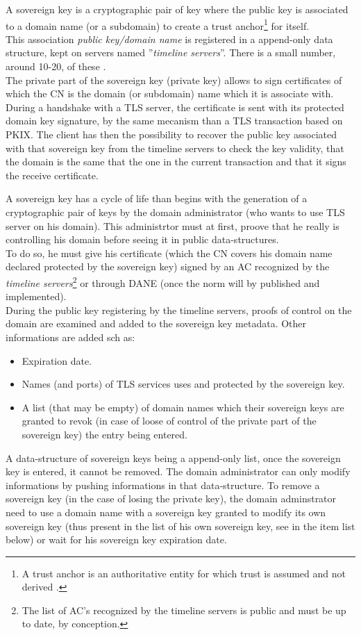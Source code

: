 \documentclass[journal, a4paper]{IEEEtran}
\begin{document}
A sovereign key is a cryptographic pair of key where the public key is associated to a domain name (or a subdomain) to create a trust anchor\footnote{A trust anchor is an authoritative entity for which trust is assumed and not derived \cite{wallace2010}.} for itself.\\
This association \textit{public key/domain name} is registered in a append-only data structure, kept on servers named ''\textit{timeline servers}''. There is a small number, around 10-20, of these \cite{eck2014}.\\
The private part of the sovereign key (private key) allows to sign certificates of which the CN is the domain (or subdomain) name which it is associate with.\\
During a handshake with a TLS server, the certificate is sent with its protected domain key signature, by the same mecanism than a TLS transaction based on PKIX. The client has then the possibility to recover the public key associated with that sovereign key from the timeline servers to check the key validity, that the domain is the same that the one in the current transaction and that it signs the receive certificate.

A sovereign key has a cycle of life than begins with the generation of a cryptographic pair of keys	by the domain administrator (who wants to use TLS server on his domain). This administrtor must at first, proove that he really is controlling his domain before seeing it in public data-structures.\\
To do so, he must give his certificate (which the CN covers his domain name declared protected by the sovereign key) signed by an AC recognized by the \textit{timeline servers}\footnote{The list of AC's recognized by the timeline servers is public and must be up to date, by conception.} or through DANE (once the norm will by published and implemented).\\
During the public key registering by the timeline servers, proofs of control on the domain are examined and added to the sovereign key metadata. Other informations are added sch as:
\begin{itemize}
	\item Expiration date.
	\item Names (and ports) of TLS services uses and protected by the sovereign key.
	\item A list (that may be empty) of domain names which their sovereign keys are granted to revok (in case of loose of control of the private part of the sovereign key) the entry being entered.
\end{itemize}
A data-structure of sovereign keys being a append-only list, once the sovereign key is entered, it cannot be removed. The domain administrator can only modify informations by pushing informations in that data-structure. To remove a sovereign key (in the case of losing the private key), the domain adminstrator need to use a domain name with a sovereign key granted to modify its own sovereign key (thus present in the list of his own sovereign key, see in the item list below) or wait for his sovereign key expiration date. 
\end{document}
